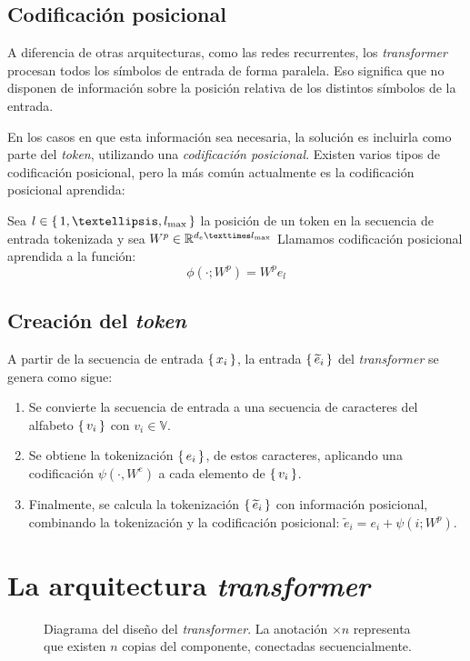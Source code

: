 \subsection{Codificación posicional}
A diferencia de otras arquitecturas, como las redes recurrentes, los \textit{transformer} procesan todos los símbolos de entrada de forma paralela. Eso significa que no disponen de información sobre la posición relativa de los distintos símbolos de la entrada. 

En los casos en que esta información sea necesaria, la solución es incluirla como parte del \textit{token}, utilizando una \textit{codificación posicional}. Existen varios tipos de codificación posicional, pero la más común actualmente es la codificación posicional aprendida: 
\begin{definition}
    Sea \( l \in \Set{1, …, l_\text{max} } \) la posición de un token en la secuencia de entrada tokenizada y sea \( W^p \in \real{d_e × l_\text{max}} \) Llamamos codificación posicional aprendida a la función:
    \[
        \phi(\cdot; W^p) = W^p e_l
    \]
\end{definition}


\subsection{Creación del \textit{token}}
A partir de la secuencia de entrada \( \{\, x_i \,\} \), la entrada \( \{\, \widetilde{e}_i \,\} \) del \textit{transformer} se genera como sigue:
\begin{enumerate}
    \item Se convierte la secuencia de entrada a una secuencia de caracteres del alfabeto \( \{\, v_i \,\} \) con \( v_i \in \mathbb{V} \).
    \item Se obtiene la tokenización \( \{\, e_i \,\} \), de estos caracteres, aplicando una codificación \( \psi(\cdot, W^e) \) a cada elemento de \( \{\, v_i \,\} \).
    \item Finalmente, se calcula la tokenización \( \{\, \widetilde{e}_i \,\} \) con información posicional, combinando la tokenización y la codificación posicional: \( \widetilde{e}_i = e_i + \psi(i; W^p) \).
\end{enumerate}

\section{La arquitectura \textit{transformer}}
\begin{figure}[tb]
    \centering
    
    \caption{Diagrama del diseño del \textit{transformer}. La anotación \( × n \) representa que existen \( n \) copias del componente, conectadas secuencialmente. \cite{zhang2021dive}}
    \label{fig:transformer}
\end{figure}

